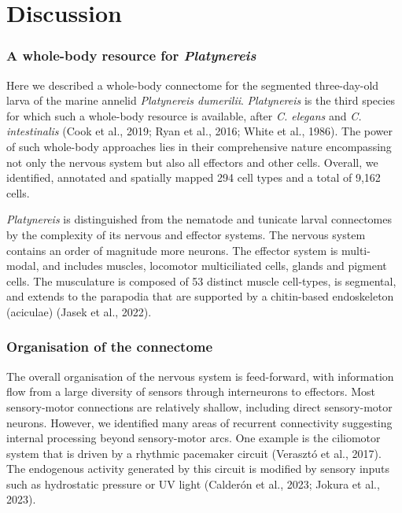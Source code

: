 \documentclass[
  11pt,
]{article}
\begin{document}
\section{Discussion}\label{discussion}

\subsubsection{\texorpdfstring{A whole-body resource for
\emph{Platynereis}}{A whole-body resource for Platynereis}}\label{a-whole-body-resource-for-platynereis}

Here we described a whole-body connectome for the segmented
three-day-old larva of the marine annelid \emph{Platynereis dumerilii}.
\emph{Platynereis} is the third species for which such a whole-body
resource is available, after \emph{C. elegans} and \emph{C.
intestinalis} (Cook et al., 2019; Ryan et al., 2016; White et al.,
1986). The power of such whole-body approaches lies in their
comprehensive nature encompassing not only the nervous system but also
all effectors and other cells. Overall, we identified, annotated and
spatially mapped 294 cell types and a total of 9,162 cells.

\emph{Platynereis} is distinguished from the nematode and tunicate
larval connectomes by the complexity of its nervous and effector
systems. The nervous system contains an order of magnitude more neurons.
The effector system is multi-modal, and includes muscles, locomotor
multiciliated cells, glands and pigment cells. The musculature is
composed of 53 distinct muscle cell-types, is segmental, and extends to
the parapodia that are supported by a chitin-based endoskeleton
(aciculae) (Jasek et al., 2022).

\subsubsection{Organisation of the
connectome}\label{organisation-of-the-connectome}

The overall organisation of the nervous system is feed-forward, with
information flow from a large diversity of sensors through interneurons
to effectors. Most sensory-motor connections are relatively shallow,
including direct sensory-motor neurons. However, we identified many
areas of recurrent connectivity suggesting internal processing beyond
sensory-motor arcs. One example is the ciliomotor system that is driven
by a rhythmic pacemaker circuit (Verasztó et al., 2017). The endogenous
activity generated by this circuit is modified by sensory inputs such as
hydrostatic pressure or UV light (Calderón et al., 2023; Jokura et al.,
2023).
\end{document}
